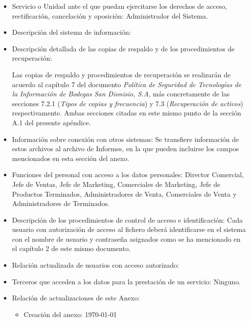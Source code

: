 \documentclass[a4paper,11pt,bibtotoc,noliststotoc]{scrbook}
\begin{document}
\begin{itemize}
\item Servicio o Unidad ante el que puedan ejercitarse los derechos de acceso, rectificación, cancelación y oposición: Administrador del Sistema.

\item Descripción del sistema de información: 

\item Descripción detallada de las copias de respaldo y de los procedimientos de recuperación:

Las copias de respaldo y procedimientos de recuperación se realizarán de acuerdo al capítulo 7 del documento \emph{Política de Seguridad de Tecnologías de la Información de Bodegas San Dionisio, S.A}, más concretamente de las secciones 7.2.1 (\emph{Tipos de copias y frecuencia}) y 7.3 (\emph{Recuperación de activos}) respectivamente. Ambas secciones citadas en este mismo punto de la sección A.1 del presente apéndice.

\item Información sobre conexión con otros sistemas: Se transfiere información de estos archivos al archivo de Informes, en la que pueden incluirse los campos mencionados en esta sección del anexo.

\item Funciones del personal con acceso a los datos personales: Director Comercial, Jefe de Ventas, Jefe de Marketing, Comerciales de Marketing, Jefe de Productos Terminados, Administradores de Venta, Comerciales de Venta y Administradores de Terminados.

\item Descripción de los procedimientos de control de acceso e identificación: Cada usuario con autorización de acceso al fichero deberá identificarse en el sistema con el nombre de usuario y contraseña asignados como se ha mencionado en el capítulo 2 de este mismo documento.

\item Relación actualizada de usuarios con acceso autorizado:


\item Terceros que acceden a los datos para la prestación de un servicio: Ninguno.


\item Relación de actualizaciones de este Anexo: 

	\begin{itemize}
	\item Creación del anexo: \today
	\end{itemize}

\end{itemize}
\end{document}
